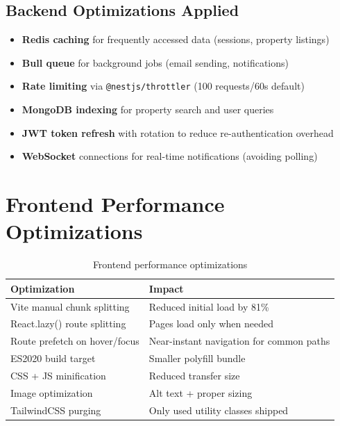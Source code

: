 \documentclass[12pt,a4paper]{article}
\begin{document}
\subsection{Backend Optimizations Applied}

\begin{itemize}[noitemsep]
    \item \textbf{Redis caching} for frequently accessed data (sessions, property listings)
    \item \textbf{Bull queue} for background jobs (email sending, notifications)
    \item \textbf{Rate limiting} via \texttt{@nestjs/throttler} (100 requests/60s default)
    \item \textbf{MongoDB indexing} for property search and user queries
    \item \textbf{JWT token refresh} with rotation to reduce re-authentication overhead
    \item \textbf{WebSocket} connections for real-time notifications (avoiding polling)
\end{itemize}

\section{Frontend Performance Optimizations}

\begin{table}[H]
\centering
\begin{tabularx}{\textwidth}{lX}
\toprule
\textbf{Optimization} & \textbf{Impact} \\
\midrule
Vite manual chunk splitting      & Reduced initial load by 81\% \\
React.lazy() route splitting     & Pages load only when needed \\
Route prefetch on hover/focus    & Near-instant navigation for common paths \\
ES2020 build target              & Smaller polyfill bundle \\
CSS + JS minification            & Reduced transfer size \\
Image optimization               & Alt text + proper sizing \\
TailwindCSS purging              & Only used utility classes shipped \\
\bottomrule
\end{tabularx}
\caption{Frontend performance optimizations}
\end{table}
\end{document}
